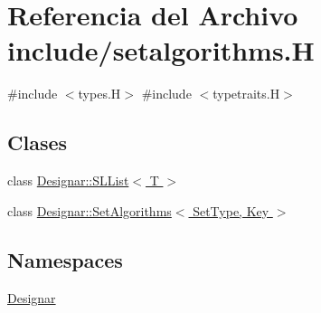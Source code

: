 \hypertarget{setalgorithms_8_h}{}\section{Referencia del Archivo include/setalgorithms.H}
\label{setalgorithms_8_h}
{\ttfamily \#include $<$types.\+H$>$}\newline
{\ttfamily \#include $<$typetraits.\+H$>$}\newline
\subsection*{Clases}
\begin{DoxyCompactItemize}
\item 
class \hyperlink{class_designar_1_1_s_l_list}{Designar\+::\+S\+L\+List$<$ T $>$}
\item 
class \hyperlink{class_designar_1_1_set_algorithms}{Designar\+::\+Set\+Algorithms$<$ Set\+Type, Key $>$}
\end{DoxyCompactItemize}
\subsection*{Namespaces}
\begin{DoxyCompactItemize}
\item 
 \hyperlink{namespace_designar}{Designar}
\end{DoxyCompactItemize}
